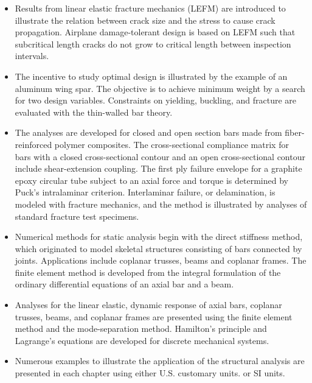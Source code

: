 \documentclass{AeroStructure-ERJohnson}
\begin{document}
\begin{itemize}
\item Results from linear elastic fracture mechanics (LEFM) are introduced to illustrate the relation between crack size and the stress to cause crack propagation. Airplane damage-tolerant design is based on LEFM such that subcritical length cracks do not grow to critical length between inspection intervals.

\item The incentive to study optimal design is illustrated by the example of an aluminum wing spar. The objective is to achieve minimum weight by a search for two design variables. Constraints on yielding, buckling, and fracture are evaluated with the thin-walled bar theory.

\item The analyses are developed for closed and open section bars made from fiber-reinforced polymer composites. The cross-sectional compliance matrix for bars with a closed cross-sectional contour and an open cross-sectional contour include shear-extension coupling. The first ply failure envelope for a graphite epoxy circular tube subject to an axial force and torque is determined by Puck's intralaminar criterion. Interlaminar failure, or delamination, is modeled with fracture mechanics, and the method is illustrated by analyses of standard fracture test specimens.

\item Numerical methods for static analysis begin with the direct stiffness method, which originated to model skeletal structures consisting of bars connected by joints. Applications include coplanar trusses, beams and coplanar frames. The finite element method is developed from the integral formulation of the ordinary differential equations of an axial bar and a beam.

\item Analyses for the linear elastic, dynamic response of axial bars, coplanar trusses, beams, and coplanar frames are presented using the finite element method and the mode-separation method. Hamilton's principle and Lagrange's equations are developed for discrete mechanical systems.

\item Numerous examples to illustrate the application of the structural analysis are presented in each chapter using either U.S. customary units. or SI units.\vspace*{5pt}
\end{itemize}
\end{document}
